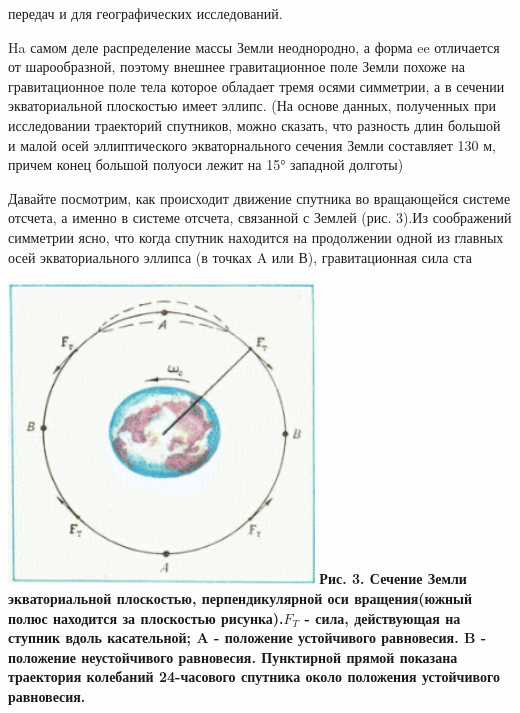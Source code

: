 \leftskip=0.3cm \rightskip=1cm
\fontsize{14}{10}\selectfont
\begin{minipage}{8cm}
	передач и для географических
	исследований.
	
	\hspace{10mm}Ha самом деле распределение массы Земли неоднородно, а форма ee 	отличается от шарообразной, поэтому	внешнее гравитационное поле Земли похоже на гравитационное поле тела которое обладает тремя осями симметрии, а в сечении 
	экваториальной плоскостью имеет эллипс. (На основе данных, полученных при исследовании траекторий спутников, можно сказать, что разность длин большой и малой осей эллиптического экваторнального сечения Земли составляет	130 м, причем конец большой полуоси лежит на 15° западной долготы)
	
	\hspace{10mm}Давайте посмотрим, как происходит движение спутника во вращающейся системе отсчета, а именно в системе отсчета, связанной с Землей (рис. 3).Из соображений симметрии ясно, что когда спутник находится на продолжении одной из главных осей экваториального эллипса (в точках A
	или В), гравитационная сила ста
	
	\includegraphics[width=230pt]{img/picture3.png}	
	\fontsize{10}{8}\selectfont
	\textbf{Рис. 3. Сечение Земли экваториальной плоскостью, перпендикулярной оси вращения(южный полюс находится за плоскостью рисунка).$F_T$ - сила, действующая на ступник вдоль касательной; A - положение устойчивого равновесия. B - положение неустойчивого равновесия. Пунктирной прямой показана траектория колебаний 24-часового спутника около положения устойчивого равновесия.}
	
\end{minipage}





